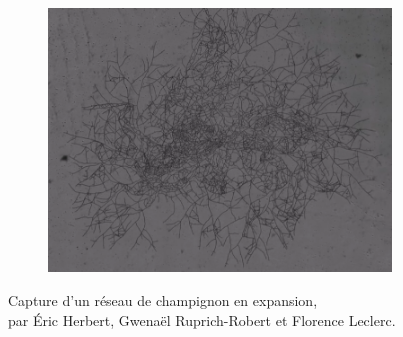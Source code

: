 \documentclass[11pt]{article}
\theoremstyle{definition}
\begin{document}
\begin{figure}[hb]
\begin{subfigure}[b]{0.5\textwidth}
\includegraphics[width=\textwidth]{Images/4.png}
\end{subfigure}
\captionsetup{justification=centering}

\caption{Capture d'un réseau de champignon en expansion, \\ par Éric Herbert, Gwenaël Ruprich-Robert et Florence Leclerc.}
\end{figure}
\newpage
\tableofcontents
\newpage

\newpage
\newpage
\newpage

\end{document}
